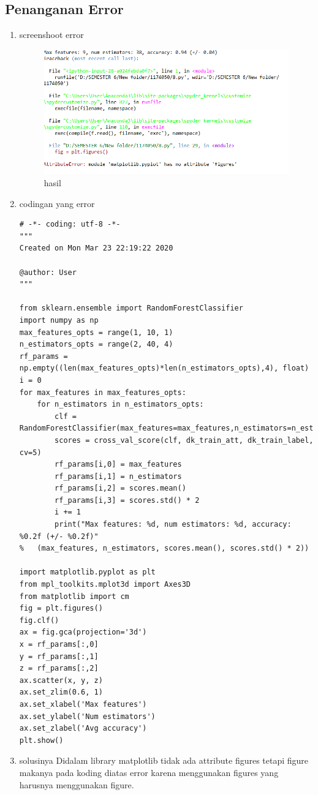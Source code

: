 \subsection{Penanganan Error}
\begin{enumerate}
\item screenshoot error

\begin{figure}[ht]
\centering
\includegraphics[scale=0.5]{figures/1174050/chapter4/error.PNG}
\caption{hasil}
\label{Error}
\end{figure}

\item codingan yang error 
\begin{verbatim}
# -*- coding: utf-8 -*-
"""
Created on Mon Mar 23 22:19:22 2020

@author: User
"""

from sklearn.ensemble import RandomForestClassifier
import numpy as np
max_features_opts = range(1, 10, 1)
n_estimators_opts = range(2, 40, 4)
rf_params = np.empty((len(max_features_opts)*len(n_estimators_opts),4), float)
i = 0
for max_features in max_features_opts:
    for n_estimators in n_estimators_opts:
        clf = RandomForestClassifier(max_features=max_features,n_estimators=n_estimators)
        scores = cross_val_score(clf, dk_train_att, dk_train_label, cv=5)
        rf_params[i,0] = max_features
        rf_params[i,1] = n_estimators
        rf_params[i,2] = scores.mean()
        rf_params[i,3] = scores.std() * 2
        i += 1
        print("Max features: %d, num estimators: %d, accuracy: %0.2f (+/- %0.2f)" 
%   (max_features, n_estimators, scores.mean(), scores.std() * 2))
        
import matplotlib.pyplot as plt
from mpl_toolkits.mplot3d import Axes3D
from matplotlib import cm
fig = plt.figures()
fig.clf()
ax = fig.gca(projection='3d')
x = rf_params[:,0]
y = rf_params[:,1]
z = rf_params[:,2]
ax.scatter(x, y, z)
ax.set_zlim(0.6, 1)
ax.set_xlabel('Max features')
ax.set_ylabel('Num estimators')
ax.set_zlabel('Avg accuracy')
plt.show()
\end{verbatim}
\item solusinya
Didalam library matplotlib tidak ada attribute figures tetapi figure makanya pada koding diatas error karena menggunakan figures yang harusnya menggunakan figure.
\end{enumerate}